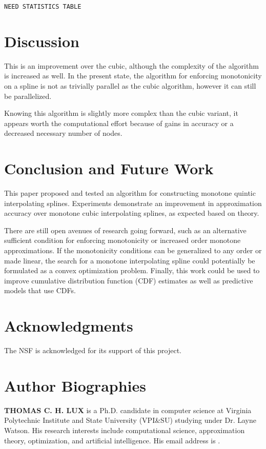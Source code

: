 \documentclass{scspaperproc}
\theoremstyle{scsthe}
\begin{document}
\texttt{NEED STATISTICS TABLE}

\section{Discussion}

This is an improvement over the cubic, although the complexity of the algorithm is increased as well. In the present state, the algorithm for enforcing monotonicity on a spline is not as trivially parallel as the cubic algorithm, however it can still be parallelized.

Knowing this algorithm is slightly more complex than the cubic variant, it appears worth the computational effort because of gains in accuracy or a decreased necessary number of nodes.


\section{Conclusion and Future Work}

This paper proposed and tested an algorithm for constructing monotone quintic interpolating splines. Experiments demonstrate an improvement in approximation accuracy over monotone cubic interpolating splines, as expected based on theory.

There are still open avenues of research going forward, such as an alternative sufficient condition for enforcing monotonicity or increased order monotone approximations. If the monotonicity conditions can be generalized to any order or made linear, the search for a monotone interpolating spline could potentially be formulated as a convex optimization problem. Finally, this work could be used to improve cumulative distribution function (CDF) estimates as well as predictive models that use CDFs.


\section*{Acknowledgments}
The NSF is acknowledged for its support of this project.





\section*{Author Biographies}

\textbf{\uppercase{THOMAS C. H. LUX}} is a Ph.D. candidate in computer
science at Virginia Polytechnic Institute and State University
(VPI\&SU) studying under Dr. Layne Watson. His research interests
include computational science, approximation theory, optimization, and
artificial intelligence. His email address is .
\end{document}
